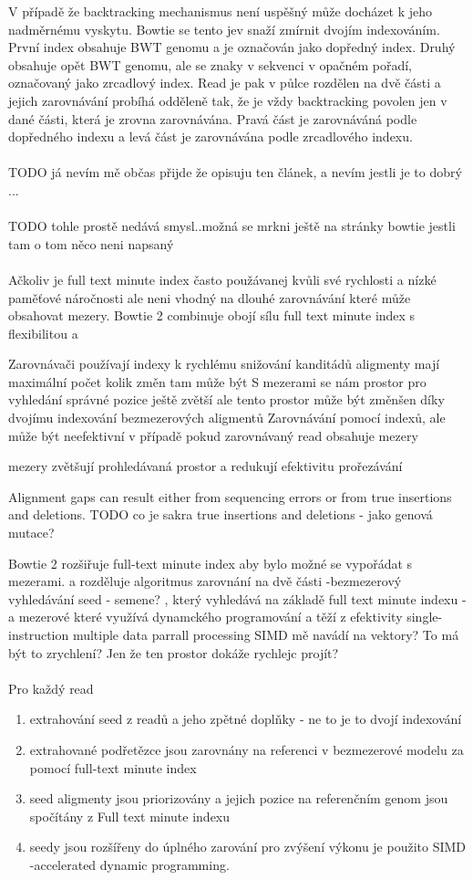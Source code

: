 \documentclass[czech,DP]{thesiskiv}
\numberwithin{equation}{section}
\begin{document}
V případě že backtracking mechanismus není uspěšný může docházet k jeho nadměrnému vyskytu. Bowtie se tento jev snaží zmírnit dvojím indexováním. První index obsahuje BWT genomu a je označován jako dopředný index. Druhý obsahuje opět BWT genomu, ale se znaky v sekvenci v opačném pořadí, označovaný jako zrcadlový index. Read je pak v půlce rozdělen na dvě části a jejich zarovnávání probíhá odděleně tak, že je vždy backtracking povolen jen v dané části, která je zrovna zarovnávána. Pravá část je zarovnáváná podle dopředného indexu a levá část je zarovnávána podle zrcadlového indexu. 
\\
\\
TODO já nevím mě občas přijde že opisuju ten článek, a nevím jestli je to dobrý ...
\\
\\
TODO tohle prostě nedává smysl..možná se mrkni ještě na stránky bowtie jestli tam o tom něco neni napsaný
\\
\\
Ačkoliv je full text minute index často použávanej kvůli své rychlosti a nízké paměťové náročnosti ale neni vhodný na dlouhé zarovnávání které může obsahovat mezery. Bowtie 2 combinuje obojí sílu full text minute index s flexibilitou a 

Zarovnávači používají indexy k rychlému snižování kanditádů 
aligmenty mají maximální počet kolik změn tam může být 
S mezerami se nám prostor pro vyhledání správné pozice ještě zvětší
ale tento prostor může být změnšen díky dvojímu indexování bezmezerových aligmentů
Zarovnávání pomocí indexů, ale může být neefektivní v případě pokud zarovnávaný read obsahuje mezery
 
 mezery zvětšují prohledávaná prostor a redukují efektivitu prořezávání
 
  

Alignment gaps can result either from sequencing errors or from true insertions and deletions. 
TODO co je sakra true insertions and deletions - jako genová mutace? 

Bowtie 2 rozšiřuje full-text minute index aby bylo možné se vypořádat s mezerami.
a rozděluje algoritmus zarovnání na dvě části
-bezmezerový vyhledávání seed - semene? , který vyhledává na základě full text minute indexu
- a mezerové které využívá dynamckého programování a těží z efektivity single- instruction multiple data parrall processing
 SIMD mě navádí na vektory? To má být to zrychlení? Jen že ten prostor dokáže rychlejc projít?
\\
\\
Pro každý read
\begin{enumerate}
	\item extrahování seed z readů a jeho zpětné doplňky - ne to je to dvojí indexování
	\item extrahované podřetězce jsou zarovnány na referenci v bezmezerové modelu za pomocí full-text minute index
	\item seed aligmenty jsou priorizovány a jejich pozice na referenčním genom jsou spočítány z Full text minute indexu
	\item seedy jsou rozšířeny do úplného zarování pro zvýšení výkonu je použito SIMD -accelerated dynamic programming.
\end{enumerate}
\end{document}
